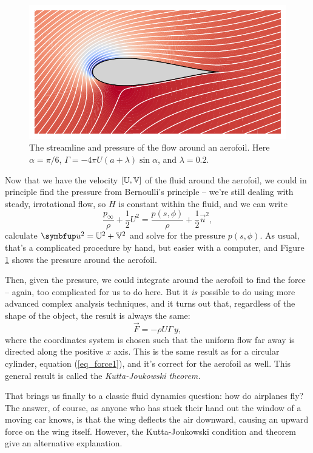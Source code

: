 \begin{figure}
\centering\includegraphics[width=\linewidth]{Figures/Chapter4/fig_aerofoil_stream}
\caption{The streamline and pressure of the flow around an aerofoil.  Here $\alpha = \pi/6$, $\Gamma = -4\pi U(a+\lambda) \sin \alpha$, and $\lambda = 0.2$.}
\label{fig_aerofoil_stream}
\end{figure}

Now that we have the velocity $[\mathbb{U}, \mathbb{V}]$ of the fluid around the aerofoil, we could in principle find the pressure from Bernoulli's principle -- we're still dealing with steady, irrotational flow, so $H$ is constant within the fluid, and we can write
\[
\frac{p_\infty}{\rho} + \frac{1}{2} U^2 = \frac{p(s, \phi)}{\rho} + \frac{1}{2} \vec{u}^2,
\]
calculate $\vec{u}^2 = \U^2 + \V^2$ and solve for the pressure $p(s, \phi)$.  As usual, that's a complicated procedure by hand, but easier with a computer, and Figure \ref{fig_aerofoil_stream} shows the pressure around the aerofoil.

Then, given the pressure, we could integrate around the aerofoil to find the force -- again, too complicated for us to do here.  But it \emph{is} possible to do using more advanced complex analysis techniques, and it turns out that, regardless of the shape of the object, the result is always the same:
\begin{equation}
\vec{F} = - \rho U \Gamma \, \unit{y},
\end{equation}
where the coordinates system is chosen such that the uniform flow far away is directed along the positive $x$ axis.  This is the same result as for a circular cylinder, equation (\ref{eq_force1}), and it's correct for the aerofoil as well.  This general result is called the \emph{Kutta-Joukowski theorem.}

That brings us finally to a classic fluid dynamics question:  how do airplanes fly?  The answer, of course, as anyone who has stuck their hand out the window of a moving car knows, is that the wing deflects the air downward, causing an upward force on the wing itself.  However, the Kutta-Joukowski condition and theorem give an alternative explanation.

